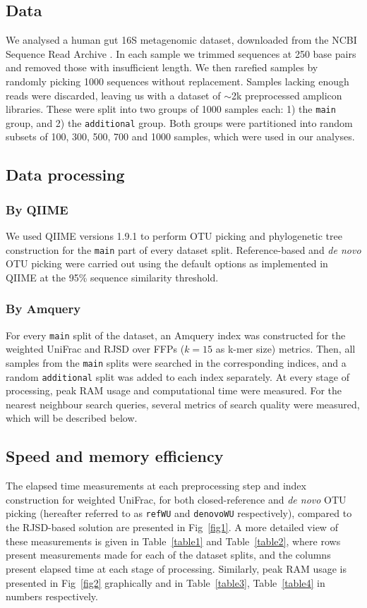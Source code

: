 \documentclass[10pt,letterpaper]{article}
\begin{document}
\subsection*{Data}
We analysed a human gut 16S metagenomic dataset, downloaded from the NCBI Sequence Read Archive \cite{leinonen2010sequence}. 
In each sample we trimmed sequences at 250 base pairs and removed those with insufficient length. 
We then rarefied samples by randomly picking 1000 sequences without replacement. Samples lacking enough reads were discarded, leaving us with a dataset of $\sim$2k preprocessed amplicon libraries. These were split into two groups of 1000 samples each: 
1) the \texttt{main} group, and 
2) the \texttt{additional} group.
Both groups were partitioned into random subsets of 100, 300, 500, 700 and 1000 samples, which were used in our analyses.

\subsection*{Data processing}

\subsubsection*{By QIIME}
We used QIIME versions 1.9.1 to perform OTU picking and phylogenetic tree construction for the \texttt{main} part of every dataset split.
Reference-based and \textit{de novo} OTU picking were carried out using the default options as implemented in QIIME at the 95\% sequence similarity threshold.

\subsubsection*{By Amquery}
For every \texttt{main} split of the dataset, an Amquery index was constructed for the weighted UniFrac and RJSD over FFPs ($k=15$ as k-mer size) metrics.
Then, all samples from the \texttt{main} splits were searched in the corresponding indices, and a random \texttt{additional} split was added to each index separately. 
At every stage of processing, peak RAM usage and computational time were measured. 
For the nearest neighbour search queries, several metrics of search quality were measured, which will be described below. 

\subsection*{Speed and memory efficiency}
The elapsed time measurements at each preprocessing step and index construction for weighted UniFrac, for both closed-reference and \textit{de novo} OTU picking (hereafter referred to as \texttt{refWU} and \texttt{denovoWU} respectively), compared to the RJSD-based solution are presented in Fig~\ref{fig1}.
A more detailed view of these measurements is given in Table~\ref{table1} and Table~\ref{table2}, where rows present measurements made for each of the dataset splits, and the columns present elapsed time at each stage of processing. 
Similarly, peak RAM usage is presented in Fig~\ref{fig2} graphically and in Table~\ref{table3}, Table~\ref{table4} in numbers respectively.
\end{document}
